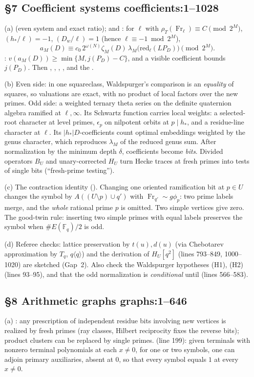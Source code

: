 \documentclass[11pt]{article}
\theoremstyle{remark}
\newcommand{\F}{\mathbb F}
\DeclareMathOperator{\Fr}{Fr}
\newcommand{\src}[2]{\textsf{\small #1:#2}}
\begin{document}
\subsection*{\S7 Coefficient systems \hfill \src{coefficients}{1--1028}}
(a)  (even system and exact ratio);  and
: for $\ell$ with $\rho_T(\Fr_\ell)\equiv C\pmod{2^M}$,
$(h_*/\ell)=-1$, $(D_w/\ell)=1$ (hence $\ell\equiv-1\bmod2^M$),
\[
 a_M(D)\equiv c_0\,2^{\omega(N)}\zeta_M(D)\,\lambda_M\bigl(\mathrm{red}_\ell(LP_D)\bigr)\pmod{2^M}.
\]
: $v(a_M(D))\ge\min\{M,j(P_D)-C\}$, and a visible coefficient
bounds $j(P_D)$. Then , , ,
, and the .

(b) Even side: in one squareclass, Waldspurger's comparison is an
\emph{equality} of squares, so valuations are exact, with no product of local
factors over the new primes. Odd side: a weighted ternary theta series on the
definite quaternion algebra ramified at $\ell,\infty$. Its Schwartz function
carries local weights: a selected-root character at level primes,
$\epsilon_p$ on nilpotent orbits at $p\mid h_*$, and a residue-line character
at $\ell$. Its $|h_*|D$-coefficients count optimal embeddings weighted by the
genus character, which reproduces $\lambda_M$ of the reduced genus sum.
After normalization by the minimum depth $\delta$, coefficients become
\emph{bits}. Divided operators $B_U$ and unary-corrected $H_U$ turn Hecke
traces at fresh primes into tests of single bits (``fresh-prime testing'').

(c) The contraction identity (). Changing one oriented
ramification bit at $p\in U$ changes the symbol by $A((U\setminus p)\cup q')$
with $\Fr_{q'}\sim g\phi_p$: two prime labels merge, and the
\emph{whole} rational prime $p$ is omitted. Two simple vertices give zero.
The good-twin rule: inserting two simple primes with equal labels preserves
the symbol when $\#E(\F_q)/2$ is odd.

(d) Referee checks: lattice preservation by $t(u),d(u)$ (via Chebotarev
approximation by $T_q$, $q\langle q\rangle$) and the derivation of
$H_U[q^2]$ (lines 793--849, 1000--1020) are sketched (Gap~2). Also check the
Waldspurger hypotheses (H1), (H2) (lines 93--95), and that the odd
normalization is \emph{conditional} until  (lines 566--583).

\subsection*{\S8 Arithmetic graphs \hfill \src{graphs}{1--646}}
(a) : any prescription of independent residue bits
involving new vertices is realized by fresh primes (ray classes, Hilbert
reciprocity fixes the reverse bits); product clusters can be replaced by
single primes.  (line 199): given terminals with nonzero
terminal polynomials at each $x\ne0$, for one or two symbols, one can adjoin
primary auxiliaries, absent at $0$, so that every symbol equals $1$ at every
$x\ne0$.
\end{document}

